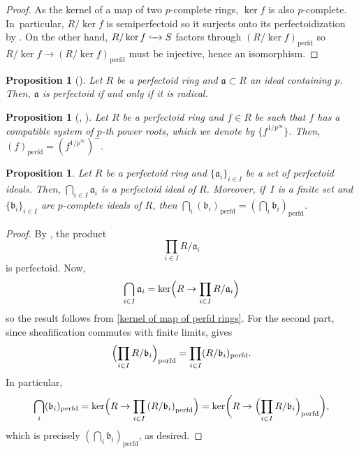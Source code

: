 \documentclass[JEP,XML,SOM,Unicode,published]{cedram}
\let\autoref\cref
\theoremstyle{plain}
\newtheorem{proposition}[theorem]{Proposition}
\theoremstyle{definition}
\numberwithin{equation}{theorem}
\newcommand{\fra}{\mathfrak{a}}
\newcommand{\frab}{\mathfrak{b}}
\newcommand{\perfd}{_{\mathrm{perfd}}}
\newcommand{\into}[1][]{\lhook \joinrel \xrightarrow{\ #1\ }}
\newcommand{\unpfty}{{1/p^\infty}}
\begin{document}
\begin{proof}
As the kernel of a map of two $p$-complete rings, $\ker f$ is also $p$-complete. In~particular, $R/\ker f$ is semiperfectoid so it surjects onto its perfectoidization by \cite[Th.\,7.4]{BhattScholzePrisms}. On the other hand, $R/\ker f\into S$ factors through $(R/\ker f)\perfd$ so $R/\ker f\to (R/\ker f)\perfd$ must be injective, hence an isomorphism.
\end{proof}

\begin{proposition}[{\cite[Prop.\,2.8]{DineIshizukaTiltingUntilting}}]\label{perfectoidization is radical when p in ideal}
Let $R$ be a perfectoid ring and $\fra\subset R$ an ideal containing $p$. Then, $\fra$ is perfectoid if and only if it is radical.
\end{proposition}

\begin{proposition}[{\cite[Ex.\,7.9]{BhattScholzePrisms}, \cite[Lem.\,2.4.3]{CaiLeeMaSchwedeTuckerPerfectoidSignature}}]\label{perfectoidization of principal ideal with roots}
Let $R$ be a perfectoid ring and $f\in R$ be such that $f$ has a compatible system of $p$-th power roots, which we denote by $\{f^{1/{p^\infty}}\}$. Then, $(f)\perfd=(f^\unpfty)^{-}$.
\end{proposition}

\begin{proposition}\label{intersection of perfectoid ideals is perfectoid}
Let $R$ be a perfectoid ring and $\{\fra_i\}_{i\in I}$ be a set of perfectoid ideals. Then, $\bigcap_{i\in I} \fra_i$ is a perfectoid ideal of $R$.
Moreover, if~$I$ is a finite set and $\{\frab_i\}_{i\in I}$ are $p$-complete ideals of $R$, then $\bigcap_i (\frab_i)\perfd=(\bigcap_i \frab_i)\perfd$.
\end{proposition}

\begin{proof}
By \cite[Ex.\,3.8\,(8)]{BhattIyengarMaRegularRings}, the product
\[
\prod_{i\in I}R/\fra_i
\]
is perfectoid. Now,
\[
\bigcap_{i\in I} \fra_i=\ker \Bigl( R\to \prod_{i\in I}R/\fra_i\Bigr)
\]
so the result follows from \autoref{kernel of map of perfd rings}.
For the second part, since sheafification commutes with finite limits, \cite[Cor.\,8.11]{BhattScholzePrisms} gives
\[
\Bigl(\prod_{i\in I} R/\frab_i\Bigr)\perfd=\prod_{i\in I}( R/\frab_i)\perfd.
\]
In particular,
\[
\bigcap_i (\frab_i)\perfd=\ker\Bigl( R\to \prod_{i\in I} \left( R/\frab_i\right)\perfd \Bigr)= \ker \biggl( R\to \Bigl(\prod_{i\in I} R/\frab_i\Bigr)\perfd\biggr),
\]
which is precisely $\left(\bigcap_i \frab_i\right)\perfd$, as desired.
\end{proof}
\end{document}
